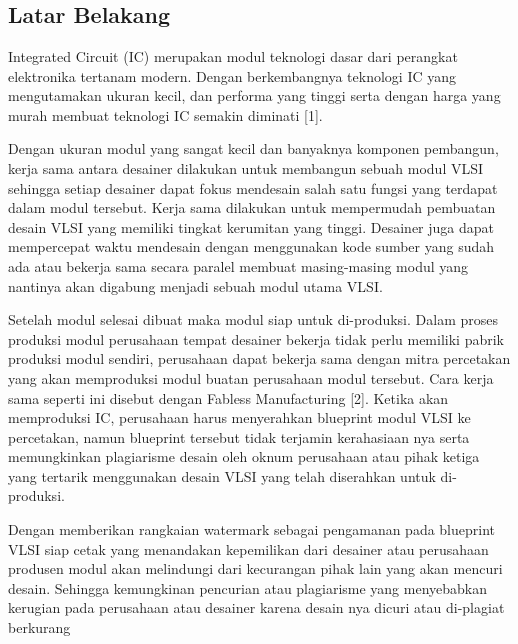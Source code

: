 \chapter{\babSatu}

\section{Latar Belakang}
Integrated Circuit (IC) merupakan modul teknologi dasar dari perangkat
elektronika tertanam modern. Dengan berkembangnya teknologi IC yang
mengutamakan ukuran kecil, dan performa yang tinggi serta dengan harga yang
murah membuat teknologi IC semakin diminati [1].

Dengan ukuran modul yang sangat kecil dan banyaknya komponen
pembangun, kerja sama antara desainer dilakukan untuk membangun sebuah
modul VLSI sehingga setiap desainer dapat fokus mendesain salah satu fungsi
yang terdapat dalam modul tersebut. Kerja sama dilakukan untuk mempermudah
pembuatan desain VLSI yang memiliki tingkat kerumitan yang tinggi. Desainer
juga dapat mempercepat waktu mendesain dengan menggunakan kode sumber
yang sudah ada atau bekerja sama secara paralel membuat masing-masing modul
yang nantinya akan digabung menjadi sebuah modul utama VLSI.

Setelah modul selesai dibuat maka modul siap untuk di-produksi. Dalam
proses produksi modul perusahaan tempat desainer bekerja tidak perlu memiliki
pabrik produksi modul sendiri, perusahaan dapat bekerja sama dengan mitra
percetakan yang akan memproduksi modul buatan perusahaan modul tersebut.
Cara kerja sama seperti ini disebut dengan Fabless Manufacturing [2]. Ketika
akan memproduksi IC, perusahaan harus menyerahkan blueprint modul VLSI ke
percetakan, namun blueprint tersebut tidak terjamin kerahasiaan nya serta
memungkinkan plagiarisme desain oleh oknum perusahaan atau pihak ketiga yang
tertarik menggunakan desain VLSI yang telah diserahkan untuk di-produksi.

Dengan memberikan rangkaian watermark sebagai pengamanan pada
blueprint VLSI siap cetak yang menandakan kepemilikan dari desainer atau
perusahaan produsen modul akan melindungi dari kecurangan pihak lain yang
akan mencuri desain. Sehingga kemungkinan pencurian atau plagiarisme yang
menyebabkan kerugian pada perusahaan atau desainer karena desain nya dicuri
atau di-plagiat berkurang

